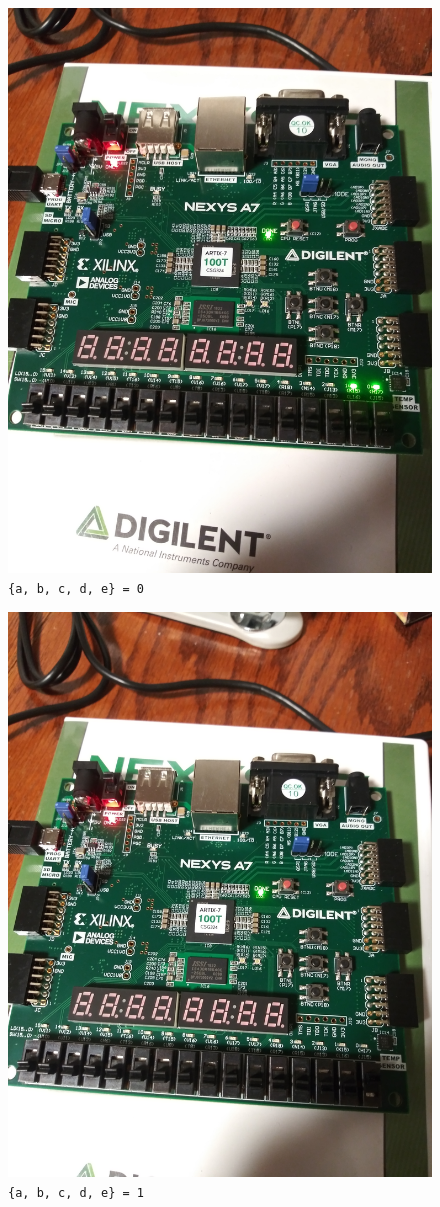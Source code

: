 \documentclass{article}
\renewcommand{\c}[1]{\texttt{#1}}
\begin{document}
\begin{figure}[H]
    \centering
    \includegraphics[width=\textwidth]{Images/board_on.jpg} 
    \caption{\c{\{a, b, c, d, e\} = 0}}
    \label{on}
\end{figure}
\begin{figure}[H]
    \centering
    \includegraphics[width=\textwidth]{Images/board_off.jpg}
    \caption{\c{\{a, b, c, d, e\} = 1}}
    \label{off}
\end{figure}
\end{document}

